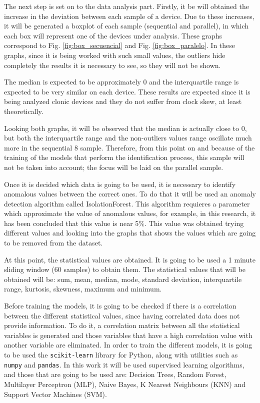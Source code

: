 The next step is set on to the data analysis part. Firstly, it be will obtained the increase in the deviation between each sample of a device. Due to these increases, it will be generated a boxplot of each sample (sequential and parallel), in which each box will represent one of the devices under analysis. These graphs correspond to Fig. \ref{fig:box_secuencial} and Fig. \ref{fig:box_paralelo}. In these graphs, since it is being worked with such small values, the outliers hide completely the results it is necessary to see, so they will not be shown. 


The median is expected to be approximately 0 and the interquartile range is expected to be very similar on each device. These results are expected since it is being analyzed clonic devices and they do not suffer from clock skew, at least theoretically.


Looking both graphs, it will be observed that the median is actually close to 0, but both the interquartile range and the non-outliers values range oscillate much more in the sequential 8 sample. Therefore, from this point on and because of the training of the models that perform the identification process, this sample will not be taken into account; the focus will be laid on the parallel sample.

Once it is decided which data is going to be used, it is necessary to identify anomalous values between the correct ones. To do that it will be used an anomaly detection algorithm called IsolationForest. This algorithm requieres a parameter which approximate the value of anomalous values, for example, in this research, it has been concluded that this value is near 5\%. This value was obtained trying different values and looking into the graphs that shows the values which are going to be removed from the dataset.


At this point, the statistical values are obtained. It is going to be used a 1 minute sliding window (60 samples) to obtain them. The statistical values that will be obtained will be: sum, mean, median, mode, standard deviation, interquartile range, kurtosis, skewness, maximum and minimum.


Before training the models, it is going to be checked if there is a correlation between the different statistical values, since having correlated data does not provide information. To do it, a correlation matrix between all the statistical variables is generated and those variables that have a high correlation value with another variable are eliminated. In order to train the different models, it is going to be used the \texttt{scikit-learn} library for Python, along with utilities such as \texttt{numpy} and \texttt{pandas}. In this work it will be used supervised learning algorithms, and those that are going to be used are: Decision Trees, Random Forest, Multilayer Perceptron (MLP), Naive Bayes, K Nearest Neighbours (KNN) and Support Vector Machines (SVM).


